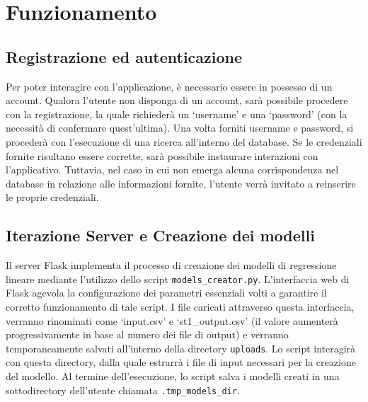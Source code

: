 \documentclass[a4paper,10pt]{article}
\begin{document}
\section{Funzionamento}

\subsection{Registrazione ed autenticazione}
Per poter interagire con l'applicazione, è necessario essere in possesso di un account. Qualora l'utente non disponga di un account, 
sarà possibile procedere con la registrazione, la quale richiederà un `username' e una `password' (con la necessità di confermare quest'ultima). 
Una volta forniti username e password, si procederà con l'esecuzione di una ricerca all'interno del database.
Se le credenziali fornite risultano essere corrette, sarà possibile instaurare interazioni con l'applicativo. 
Tuttavia, nel caso in cui non emerga alcuna corrispondenza nel database in relazione alle informazioni fornite, 
l'utente verrà invitato a reinserire le proprie credenziali. 

\subsection{Iterazione Server e Creazione dei modelli}

Il server Flask implementa il processo di creazione dei modelli di regressione lineare mediante l'utilizzo dello script \texttt{models\_creator.py}. 
L'interfaccia web di Flask agevola la configurazione dei parametri essenziali volti a garantire il corretto funzionamento di tale script. 
I file caricati attraverso questa interfaccia, verranno rinominati come `input.csv' e `st1\_output.csv' (il valore aumenterà progressivamente in base al numero dei file di output)
e verranno temporaneamente salvati all'interno della directory \texttt{uploads}.
Lo script interagirà con questa directory, dalla quale estrarrà i file di input necessari per la creazione del modello.
Al termine dell'esecuzione, lo script salva i modelli creati in una sottodirectory dell'utente chiamata \texttt{.tmp\_models\_dir}.
\end{document}
